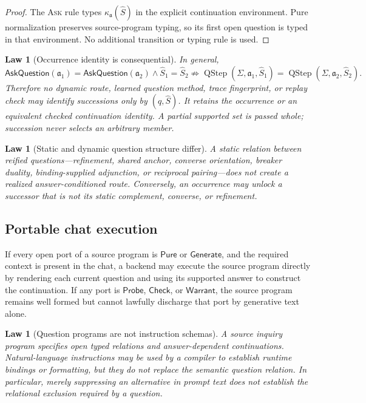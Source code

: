 \documentclass[11pt,oneside]{article}
\newtheorem{law}[definition]{Law}
\newcommand{\QStep}{\operatorname{QStep}}
\newcommand{\AskRef}{\mathfrak a}
\begin{document}
\begin{proof}
The \textsc{Ask} rule types \(\kappa_{\AskRef}(\widehat S)\) in the explicit continuation
environment.
Pure normalization preserves source-program typing, so its first open question is typed in that
environment.  No additional transition or typing rule is used.
\end{proof}

\begin{law}[Occurrence identity is consequential]\label{law:qsucc-occurrence-identity}
In general,
\[
\mathsf{AskQuestion}(\AskRef_1)=\mathsf{AskQuestion}(\AskRef_2)
\land \widehat S_1=\widehat S_2
\not\Rightarrow
\QStep(\Sigma,\AskRef_1,\widehat S_1)
=
\QStep(\Sigma,\AskRef_2,\widehat S_2).
\]
Therefore no dynamic route, learned question method, trace fingerprint, or replay check may identify
successions only by \((q,\widehat S)\).  It retains the occurrence or an equivalent checked continuation
identity.  A partial supported set is passed whole; succession never selects an arbitrary member.
\end{law}

\begin{law}[Static and dynamic question structure differ]\label{law:q-static-dynamic}
A static relation between reified questions---refinement, shared anchor, converse orientation,
breaker duality, binding-supplied adjunction, or reciprocal pairing---does not create a realized
answer-conditioned route.  Conversely, an occurrence may unlock a successor that is not its static
complement, converse, or refinement.
\end{law}

\subsection{Portable chat execution}

If every open port of a source program is \(\mathsf{Pure}\) or \(\mathsf{Generate}\), and the required context is present in the chat, a backend may execute the source program directly by rendering each current question and using its supported answer to construct the continuation.  If any port is \(\mathsf{Probe}\), \(\mathsf{Check}\), or \(\mathsf{Warrant}\), the source program remains well formed but cannot lawfully discharge that port by generative text alone.

\begin{law}[Question programs are not instruction schemas]
A source inquiry program specifies open typed relations and answer-dependent continuations.  Natural-language instructions may be used by a compiler to establish runtime bindings or formatting, but they do not replace the semantic question relation.  In particular, merely suppressing an alternative in prompt text does not establish the relational exclusion required by a question.
\end{law}
\end{document}
